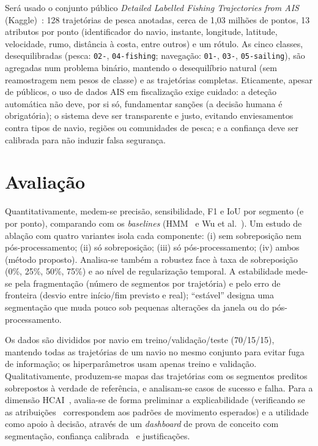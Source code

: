 \documentclass{article}
\begin{document}
Será usado o conjunto público \emph{Detailed Labelled Fishing Trajectories from AIS} (Kaggle)~\cite{kaggleAIS}: 128 trajetórias de pesca anotadas, cerca de 1,03 milhões de pontos, 13 atributos por ponto (identificador do navio, instante, longitude, latitude, velocidade, rumo, distância à costa, entre outros) e um rótulo. As cinco classes, desequilibradas (pesca: \texttt{02-}, \texttt{04-fishing}; navegação: \texttt{01-}, \texttt{03-}, \texttt{05-sailing}), são agregadas num problema binário, mantendo o desequilíbrio natural (sem reamostragem nem pesos de classe) e as trajetórias completas. Eticamente, apesar de públicos, o uso de dados AIS em fiscalização exige cuidado: a deteção automática não deve, por si só, fundamentar sanções (a decisão humana é obrigatória); o sistema deve ser transparente e justo, evitando enviesamentos contra tipos de navio, regiões ou comunidades de pesca; e a confiança deve ser calibrada para não induzir falsa segurança.

\section{Avaliação}
\label{sec:avaliacao}

Quantitativamente, medem-se precisão, sensibilidade, F1 e IoU por segmento (e por ponto), comparando com os \emph{baselines} (HMM~\cite{peel2011} e Wu et al.~). Um estudo de ablação com quatro variantes isola cada componente: (i) sem sobreposição nem pós-processamento; (ii) só sobreposição; (iii) só pós-processamento; (iv) ambos (método proposto). Analisa-se também a robustez face à taxa de sobreposição (0\%, 25\%, 50\%, 75\%) e ao nível de regularização temporal. A estabilidade mede-se pela fragmentação (número de segmentos por trajetória) e pelo erro de fronteira (desvio entre início/fim previsto e real); ``estável'' designa uma segmentação que muda pouco sob pequenas alterações da janela ou do pós-processamento.

Os dados são divididos por navio em treino/validação/teste (70/15/15), mantendo todas as trajetórias de um navio no mesmo conjunto para evitar fuga de informação; os hiperparâmetros usam apenas treino e validação. Qualitativamente, produzem-se mapas das trajetórias com os segmentos preditos sobrepostos à verdade de referência, e analisam-se casos de sucesso e falha. Para a dimensão HCAI~\cite{shneiderman2020}, avalia-se de forma preliminar a explicabilidade (verificando se as atribuições~\cite{lundberg2017} correspondem aos padrões de movimento esperados) e a utilidade como apoio à decisão, através de um \emph{dashboard} de prova de conceito com segmentação, confiança calibrada~\cite{guo2017} e justificações.



\end{document}
